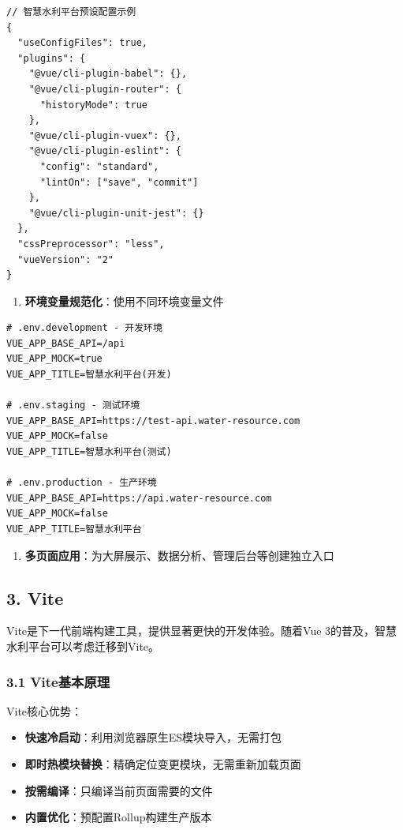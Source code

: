 \begin{lstlisting}
// 智慧水利平台预设配置示例
{
  "useConfigFiles": true,
  "plugins": {
    "@vue/cli-plugin-babel": {},
    "@vue/cli-plugin-router": {
      "historyMode": true
    },
    "@vue/cli-plugin-vuex": {},
    "@vue/cli-plugin-eslint": {
      "config": "standard",
      "lintOn": ["save", "commit"]
    },
    "@vue/cli-plugin-unit-jest": {}
  },
  "cssPreprocessor": "less",
  "vueVersion": "2"
}
\end{lstlisting}

\begin{enumerate}
\def\labelenumi{\arabic{enumi}.}
\setcounter{enumi}{1}
\tightlist
\item
  \textbf{环境变量规范化}：使用不同环境变量文件
\end{enumerate}

\begin{lstlisting}
# .env.development - 开发环境
VUE_APP_BASE_API=/api
VUE_APP_MOCK=true
VUE_APP_TITLE=智慧水利平台(开发)

# .env.staging - 测试环境
VUE_APP_BASE_API=https://test-api.water-resource.com
VUE_APP_MOCK=false
VUE_APP_TITLE=智慧水利平台(测试)

# .env.production - 生产环境
VUE_APP_BASE_API=https://api.water-resource.com
VUE_APP_MOCK=false
VUE_APP_TITLE=智慧水利平台
\end{lstlisting}

\begin{enumerate}
\def\labelenumi{\arabic{enumi}.}
\setcounter{enumi}{2}
\tightlist
\item
  \textbf{多页面应用}：为大屏展示、数据分析、管理后台等创建独立入口
\end{enumerate}

\subsection{3. Vite}\label{vite}

Vite是下一代前端构建工具，提供显著更快的开发体验。随着Vue
3的普及，智慧水利平台可以考虑迁移到Vite。

\subsubsection{3.1 Vite基本原理}\label{viteux57faux672cux539fux7406}

Vite核心优势：

\begin{itemize}
\tightlist
\item
  \textbf{快速冷启动}：利用浏览器原生ES模块导入，无需打包
\item
  \textbf{即时热模块替换}：精确定位变更模块，无需重新加载页面
\item
  \textbf{按需编译}：只编译当前页面需要的文件
\item
  \textbf{内置优化}：预配置Rollup构建生产版本
\end{itemize}

